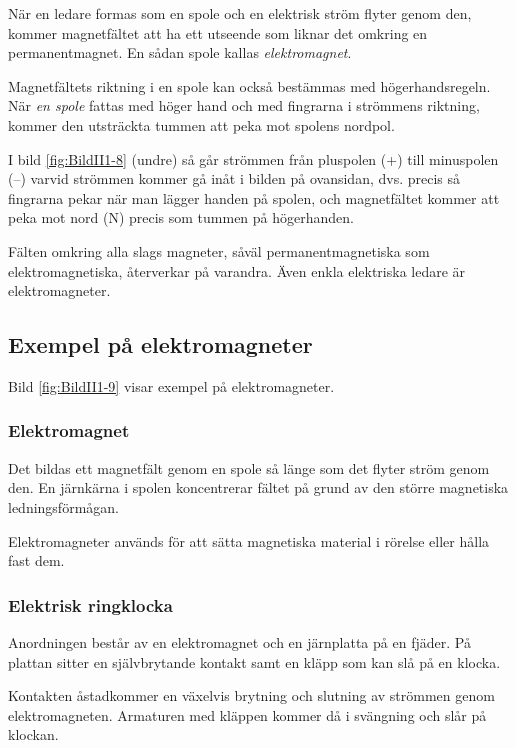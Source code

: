 När en ledare formas som en spole och en elektrisk ström flyter genom den,
kommer magnetfältet att ha ett utseende som liknar det omkring en
permanentmagnet.
En sådan spole kallas \emph{elektromagnet}.

Magnetfältets riktning i en spole kan också bestämmas med högerhandsregeln.
När \emph{en spole} fattas med höger hand och med fingrarna i strömmens
riktning, kommer den utsträckta tummen att peka mot spolens nordpol.

I bild \ref{fig:BildII1-8} (undre) så går strömmen från pluspolen (+) till
minuspolen (--) varvid strömmen kommer gå inåt i bilden på ovansidan, dvs.
precis så fingrarna pekar när man lägger handen på spolen, och magnetfältet
kommer att peka mot nord (N) precis som tummen på högerhanden.

Fälten omkring alla slags magneter, såväl permanentmagnetiska som
elektromagnetiska, återverkar på varandra.
Även enkla elektriska ledare är elektromagneter.


\subsection{Exempel på elektromagneter}

Bild \ref{fig:BildII1-9} visar exempel på elektromagneter.

\subsubsection{Elektromagnet}
Det bildas ett magnetfält genom en spole så länge som det flyter ström genom
den.
En järnkärna i spolen koncentrerar fältet på grund av den större magnetiska
ledningsförmågan.

Elektromagneter används för att sätta magnetiska material i rörelse eller hålla
fast dem.

\subsubsection{Elektrisk ringklocka}
Anordningen består av en elektromagnet och en järnplatta på en fjäder.
På plattan sitter en självbrytande kontakt samt en kläpp som kan slå på en
klocka.

Kontakten åstadkommer en växelvis brytning och slutning av strömmen genom
elektromagneten.
Armaturen med kläppen kommer då i svängning och slår på klockan.

